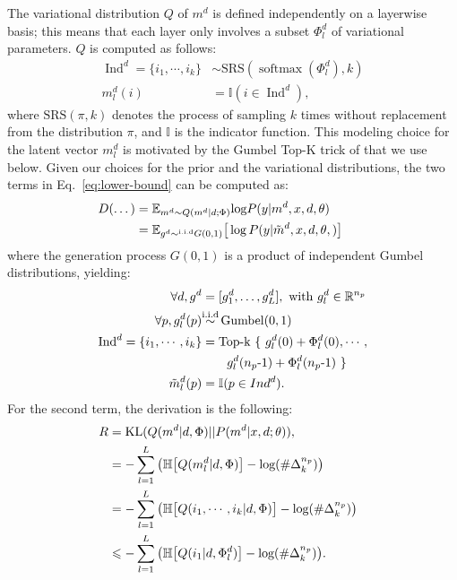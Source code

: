 \documentclass[11pt]{article}
\newcommand{\fyDone}[1]{\done[FY]\Todo[FY:]{\textcolor{orange}{#1}}}
\begin{document}
The variational distribution $Q$ of $m^d$ is defined independently on a layerwise basis; this means that each layer only involves a subset $\Phi_l^d$ of variational parameters. $Q$ is computed as follows:
\begin{align}
  \operatorname{Ind}^d = \{ i_1, \cdots, i_k \} & \sim \text{SRS}(\operatorname{softmax}(\Phi_l^d), k) \nonumber \\
  m_l^d(i) & =  \text{$\mathbb{I}$}(i \in \operatorname{Ind}^d), \nonumber
\end{align}
where $\text{SRS}(\pi,k)$ denotes the process of sampling $k$ times without replacement from the distribution $\pi$, and $\mathbb{I}$ is the indicator function. This modeling choice for the latent vector $m_l^d$ is motivated by the Gumbel Top-K trick of \citet{Kool19stochastic} that we use below.  Given our choices for the prior and the variational distributions, the two terms in Eq.~\eqref{eq:lower-bound} can be computed as:
\begin{align}
\hspace{-2.em}
D(\dots) &= \mathbb{E}_{m^d \sim Q(m^d | d; \Phi)} \text{log} P(y | m^d, x, d, \theta) \nonumber \\
&= \mathbb{E}_{g^d \sim^{\text{i.i.d}} G(0,1)} \big[ \log P(y |\tilde{m}^d, x, d, \theta,) \big] \nonumber
\end{align}
where the generation process $G(0,1)$ is a product of independent Gumbel distributions, yielding:
\begin{align}
  \hspace{-2.em}
  \forall d,  g^d & =  [g_1^d, \dots, g_L^d],  \text{ with } g_l^d \in \mathbb{R}^{n_p} \nonumber \\
  \forall p,  g_l^d(p) & \displaystyle{\mathop{\sim}^{\text{i.i.d}}} \operatorname{Gumbel}(0,1) \nonumber \\
  \operatorname{Ind}^d = \{ i_1, \cdots, i_k \} &= \operatorname{Top-k} \ \{ \ g_l^d(0) + \Phi_l^d(0), \cdots, \nonumber \\ 
       & \quad \quad g_l^d(n_p\text{-}1) + \Phi_l^d(n_p\text{-}1) \ \}\label{eq:top-k} \\
\tilde{m}_l^d(p) &= \mathbb{I}(p \in Ind^d). \nonumber 
\end{align}
For the second term, the derivation is the following:\fyDone{Check this: we have a sum over layers ?Also: R or -R ?} 
\begin{align}
\hspace{-2.em}
  R    &= \operatorname{KL}(Q(m^d | d, \Phi)||P(m^d | x, d; \theta)), \nonumber \\ 
	&= -\sum_{l=1}^L \big(\mathbb{H} \big[ Q(m_l^d | d, \Phi) \big] - \text{log}(\#\Delta^{n_p}_k) \big) \nonumber \\ 
	&= -\sum_{l=1}^L \big(\mathbb{H} \big[ Q(i_1,\cdots,i_k | d, \Phi) \big] - \text{log}(\#\Delta^{n_p}_k) \big)\nonumber \\
	&\leqslant  -\sum_{l=1}^L \big(\mathbb{H} \big[ Q(i_1 | d, \Phi_l^d) \big] - \text{log}(\#\Delta^{n_p}_k) \big). \label{eq:entropy}
\end{align}
\end{document}
